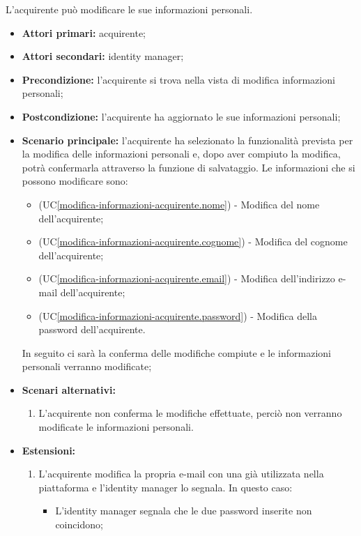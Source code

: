 L'acquirente può modificare le sue informazioni personali.
\begin{itemize}
    \item \textbf{Attori primari:} acquirente;
    \item \textbf{Attori secondari:} identity manager;
    \item \textbf{Precondizione:} l'acquirente si trova nella vista di modifica informazioni personali;
    \item \textbf{Postcondizione:} l'acquirente ha aggiornato le sue informazioni personali;
    \item \textbf{Scenario principale:} l'acquirente ha selezionato la funzionalità prevista per la modifica delle informazioni personali e, dopo aver compiuto la modifica, potrà confermarla attraverso la funzione di salvataggio. Le informazioni che si possono modificare sono:
    \begin{itemize}
        \item (UC\ref{modifica-informazioni-acquirente.nome}) - Modifica del nome dell'acquirente;
        \item (UC\ref{modifica-informazioni-acquirente.cognome}) - Modifica del cognome dell'acquirente;
        \item (UC\ref{modifica-informazioni-acquirente.email}) - Modifica dell'indirizzo e-mail dell'acquirente;
        \item (UC\ref{modifica-informazioni-acquirente.password}) - Modifica della password dell'acquirente.
    \end{itemize}
    In seguito ci sarà la conferma delle modifiche compiute e le informazioni personali verranno modificate;
    \item \textbf{Scenari alternativi:}
    \begin{enumerate}[label=\lett]
        \item L'acquirente non conferma le modifiche effettuate, perciò non verranno modificate le informazioni personali.
    \end{enumerate}
    \item \textbf{Estensioni:} 
    \begin{enumerate}[label=\lett]
        \item L'acquirente modifica la propria e-mail con una già utilizzata nella piattaforma e l'identity manager lo segnala. In questo caso:
        \begin{itemize}
            \item L'identity manager segnala che le due password inserite non coincidono;

\end{itemize}
\end{enumerate}
\end{itemize}
